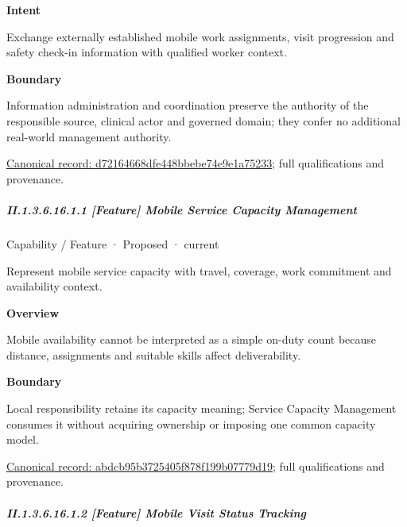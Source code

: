 \textbf{Intent}



Exchange externally established mobile work assignments, visit progression and safety check-in information with qualified worker context.



\textbf{Boundary}



Information administration and coordination preserve the authority of the responsible source, clinical actor and governed domain; they confer no additional real-world management authority.


{\footnotesize \href{../../../../../../../continuum/strategy/capability/d72164668dfe448bbebe74e9e1a75233.md}{Canonical record: d72164668dfe448bbebe74e9e1a75233}; full qualifications and provenance.}\par
\subparagraph*{II.1.3.6.16.1.1 [Feature] Mobile Service Capacity Management}
\label{navigation:II.1.3.6.16.1.1}

\label{element:abdcb95b3725405f878f199b07779d19}
{\small Capability / Feature · Proposed · current}\par

Represent mobile service capacity with travel, coverage, work commitment and availability context.



\textbf{Overview}



Mobile availability cannot be interpreted as a simple on-duty count because distance, assignments and suitable skills affect deliverability.



\textbf{Boundary}



Local responsibility retains its capacity meaning; Service Capacity Management consumes it without acquiring ownership or imposing one common capacity model.


{\footnotesize \href{../../../../../../../continuum/strategy/capability/feature/abdcb95b3725405f878f199b07779d19.md}{Canonical record: abdcb95b3725405f878f199b07779d19}; full qualifications and provenance.}\par
\subparagraph*{II.1.3.6.16.1.2 [Feature] Mobile Visit Status Tracking}
\label{navigation:II.1.3.6.16.1.2}

